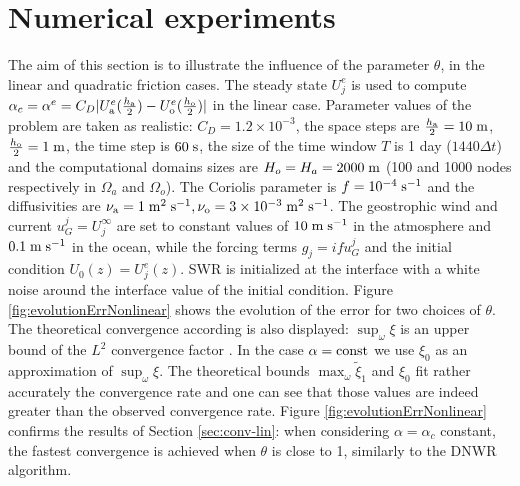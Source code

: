 \section{Numerical experiments}
\label{sec:num-exp}
The aim of this section is to illustrate the influence of the parameter $\theta$, in the linear and quadratic friction cases. 
The steady state $U_j^e$ is used to compute $\alpha_c = \alpha^e = C_D|U_{\rm a}^e(\frac{h_{\rm a}}{2}) - U_{\rm o}^e (\frac{h_{\rm o}}{2})|$ in the linear case.
Parameter values of the problem are taken as realistic:
$C_D = 1.2\times 10^{-3}$, the space steps are
$\frac{h_{\rm a}}{2} = 10\; {\rm m}$, $\frac{h_{\rm o}}{2} = 1 \;{\rm m}$,
the time step  is $60 \;{\rm s}$,
the size of the time window $T$ is 1 day ($1440\Delta t$) and the computational domains sizes are $H_o = H_a = 2000 \; {\rm m}$
(100 and 1000 nodes respectively in $\Omega_a$ and $\Omega_o$).
The Coriolis parameter is 
$f=10^{-4}\; {\rm s^{-1}}$ and the diffusivities are 
$\nu_{\rm a} = 1\; {\rm m^2}\;{\rm s}^{-1}, 
\nu_{\rm o} = 3\times 10^{-3} \;{\rm m^2}\;{\rm s}^{-1}$. 
The geostrophic wind and current $u_G^j = U_j^\infty$
are  set to constant values of $10\;{\rm m}\;{\rm s}^{-1}$ in the 
atmosphere and $0.1\;{\rm m}\;{\rm s}^{-1}$ in the ocean, while the forcing terms 
$g_j=i f u_G^j$ and the initial condition $U_0(z)=U_j^e(z)$.
SWR is 
initialized at the interface with a white noise around the interface value
of the initial condition.
Figure \ref{fig:evolutionErrNonlinear} shows the evolution of the error for two choices of $\theta$. The theoretical
convergence according is
also displayed: $\sup_\omega \xi$ is an upper bound of the $L^2$ convergence factor \citep{thery_etude_2021}. In the case
$\alpha={\rm const}$ we use $\xi_0$ as an approximation of
$\sup_\omega \xi$.
The theoretical bounds $\max_\omega \widetilde{\xi}_1$ and $\xi_0$
fit rather accurately the convergence rate and one can see that
those values are indeed greater than the observed convergence rate.
Figure \ref{fig:evolutionErrNonlinear} confirms the results of Section \ref{sec:conv-lin}:
when considering $\alpha=\alpha_c$ constant, the fastest convergence is achieved when $\theta$ is close to 1, similarly to the DNWR algorithm.
